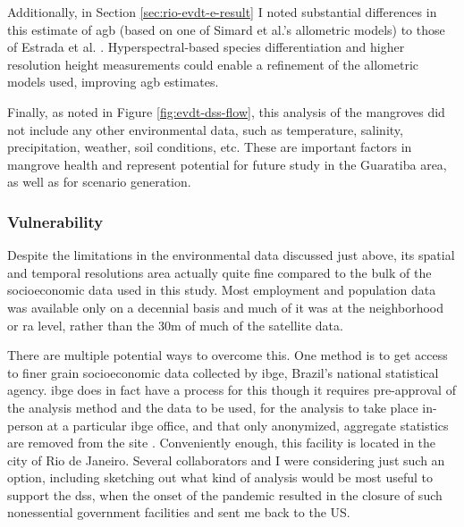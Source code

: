 Additionally, in Section \ref{sec:rio-evdt-e-result} I noted substantial differences in this estimate of \ac{agb} (based on one of Simard et al.'s allometric models) to those of Estrada et al. \cite{estradaEconomicEvaluationCarbon2015}. Hyperspectral-based species differentiation and higher resolution height measurements could enable a refinement of the allometric models used, improving \ac{agb} estimates. 

Finally, as noted in Figure \ref{fig:evdt-dss-flow}, this analysis of the mangroves did not include any other environmental data, such as temperature, salinity, precipitation, weather, soil conditions, etc. These are important factors in mangrove health and represent potential for future study in the Guaratiba area, as well as for scenario generation.

\subsubsection{Vulnerability}

Despite the limitations in the environmental data discussed just above, its spatial and temporal resolutions area actually quite fine compared to the bulk of the socioeconomic data used in this study. Most employment and population data was available only on a decennial basis and much of it was at the neighborhood or \ac{ra} level, rather than the 30m of much of the satellite data. 

There are multiple potential ways to overcome this. One method is to get access to finer grain socioeconomic data collected by \ac{ibge}, Brazil's national statistical agency. \ac{ibge} does in fact have a process for this though it requires pre-approval of the analysis method and the data to be used, for the analysis to take place in-person at a particular \ac{ibge} office, and that only anonymized, aggregate statistics are removed from the site \cite{institutobrasileirodegeografiaeestatisticaPedidosComoFazer2014}. Conveniently enough, this facility is located in the city of Rio de Janeiro. Several collaborators and I were considering just such an option, including sketching out what kind of analysis would be most useful to support the \ac{dss}, when the onset of the pandemic resulted in the closure of such nonessential government facilities and sent me back to the US. 

